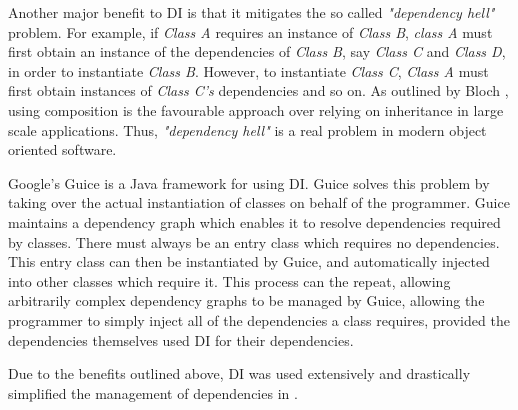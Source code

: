 Another major benefit to DI is that it mitigates the so called \textit{"dependency hell"} problem. For example, if \textit{Class A} requires an instance of \textit{Class B}, \textit{class A} must first obtain an instance of the dependencies of \textit{Class B}, say \textit{Class C} and \textit{Class D}, in order to instantiate \textit{Class B}. However, to instantiate \textit{Class C}, \textit{Class A} must first obtain instances of \textit{Class C's} dependencies and so on. As outlined by Bloch \cite{effecitve-java}, using composition is the favourable approach over relying on inheritance in large scale applications. Thus, \textit{"dependency hell"} is a real problem in modern object oriented software.

Google's Guice \cite{guice} is a Java framework for using DI. Guice solves this problem by taking over the actual instantiation of classes on behalf of the programmer. Guice maintains a dependency graph which enables it to resolve dependencies required by classes. There must always be an entry class which requires no dependencies. This entry class can then be instantiated by Guice, and automatically injected into other classes which require it. This process can the repeat, allowing arbitrarily complex dependency graphs to be managed by Guice, allowing the programmer to simply inject all of the dependencies a class requires, provided the dependencies themselves used DI for their dependencies.

Due to the benefits outlined above, DI was used extensively and drastically simplified the management of dependencies in \game{}.